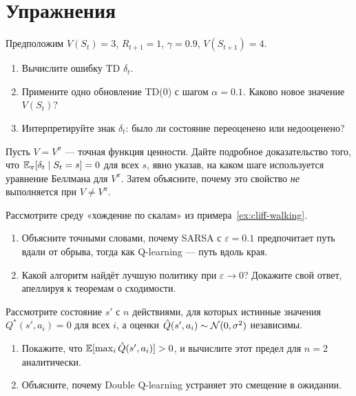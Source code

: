 \section*{Упражнения}

\begin{exercise}
\label{ex:td-error-basic}
Предположим $V(S_t)=3$, $R_{t+1}=1$, $\gamma=0.9$, $V(S_{t+1})=4$.
\begin{enumerate}[label=(\alph*)]
  \item Вычислите ошибку TD $\delta_t$.
  \item Примените одно обновление TD(0) с шагом $\alpha=0.1$.  Каково новое значение $V(S_t)$?
  \item Интерпретируйте знак $\delta_t$: было ли состояние переоценено или недооценено?
\end{enumerate}
\end{exercise}

\begin{exercise}
\label{ex:td-error-zero-mean}
Пусть $V = V^\pi$ --- точная функция ценности.  Дайте подробное доказательство того, что $\operatorname{\mathbb{E}}_\pi[\delta_t \mid S_t=s]=0$ для всех $s$, явно указав, на каком шаге используется уравнение Беллмана для $V^\pi$.  Затем объясните, почему это свойство \emph{не} выполняется при $V \ne V^\pi$.
\end{exercise}

\begin{exercise}
\label{ex:sarsa-vs-qlearn}
Рассмотрите среду «хождение по скалам» из примера~\ref{ex:cliff-walking}.
\begin{enumerate}[label=(\alph*)]
  \item Объясните точными словами, почему SARSA с $\varepsilon=0.1$ предпочитает путь вдали от обрыва, тогда как Q-learning --- путь вдоль края.
  \item Какой алгоритм найдёт лучшую политику при $\varepsilon \to 0$?  Докажите свой ответ, апеллируя к теоремам о сходимости.
\end{enumerate}
\end{exercise}

\begin{exercise}
\label{ex:double-q-bias}
Рассмотрите состояние $s'$ с $n$ действиями, для которых истинные значения $Q^*(s',a_i)=0$ для всех $i$, а оценки $\hat Q(s',a_i)\sim\mathcal{N}(0,\sigma^2)$ независимы.
\begin{enumerate}[label=(\alph*)]
  \item Покажите, что $\operatorname{\mathbb{E}}[\max_i\hat Q(s',a_i)] > 0$, и вычислите этот предел для $n=2$ аналитически.
  \item Объясните, почему Double Q-learning устраняет это смещение в ожидании.
\end{enumerate}
\end{exercise}

